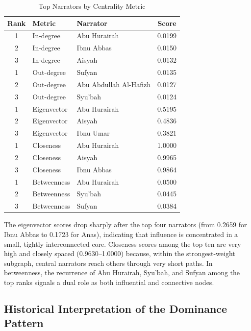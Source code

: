 \documentclass[conference]{IEEEtran}
\begin{document}
\begin{table}[!t]
\caption{Top Narrators by Centrality Metric}
\label{tab:topnarrators}
\centering
\renewcommand{\arraystretch}{1.3}
\begin{tabular}{cllc}
\toprule
Rank & Metric & Narrator & Score \\
\midrule
1 & In-degree    & Abu Hurairah          & 0.0199 \\
2 & In-degree    & Ibnu Abbas            & 0.0150 \\
3 & In-degree    & Aisyah                & 0.0132 \\
\midrule
1 & Out-degree   & Sufyan                & 0.0135 \\
2 & Out-degree   & Abu Abdullah Al-Hafizh & 0.0127 \\
3 & Out-degree   & Syu'bah               & 0.0124 \\
\midrule
1 & Eigenvector  & Abu Hurairah          & 0.5195 \\
2 & Eigenvector  & Aisyah                & 0.4836 \\
3 & Eigenvector  & Ibnu Umar             & 0.3821 \\
\midrule
1 & Closeness    & Abu Hurairah          & 1.0000 \\
2 & Closeness    & Aisyah                & 0.9965 \\
3 & Closeness    & Ibnu Abbas            & 0.9864 \\
\midrule
1 & Betweenness  & Abu Hurairah          & 0.0500 \\
2 & Betweenness  & Syu'bah               & 0.0445 \\
3 & Betweenness  & Sufyan                & 0.0384 \\
\bottomrule
\end{tabular}
\end{table}

The eigenvector scores drop sharply after the top four narrators (from 0.2659
for Ibnu Abbas to 0.1723 for Anas), indicating that influence is concentrated in
a small, tightly interconnected core. Closeness scores among the top ten are very
high and closely spaced (0.9630--1.0000) because, within the strongest-weight
subgraph, central narrators reach others through very short paths. In
betweenness, the recurrence of Abu Hurairah, Syu'bah, and Sufyan among the top
ranks signals a dual role as both influential and connective nodes.

\subsection{Historical Interpretation of the Dominance Pattern}
\end{document}
